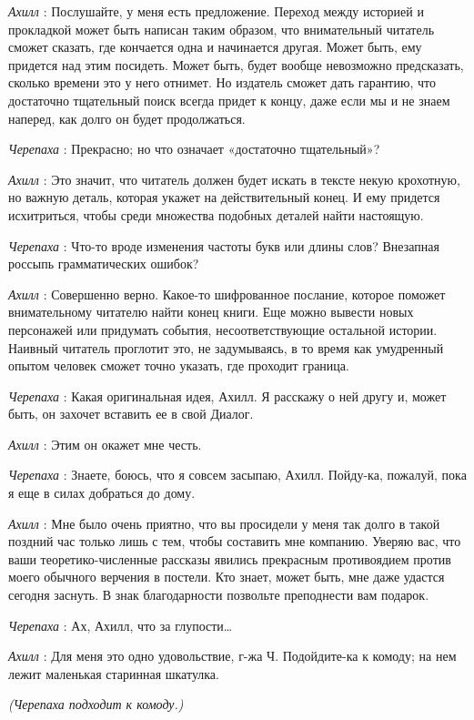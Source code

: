 \emph{Ахилл} : Послушайте, у меня есть предложение. Переход между историей и прокладкой может быть написан таким образом, что внимательный читатель сможет сказать, где кончается одна и начинается другая. Может быть, ему придется над этим посидеть. Может быть, будет вообще невозможно предсказать, сколько времени это у него отнимет. Но издатель сможет дать гарантию, что достаточно тщательный поиск всегда придет к концу, даже если мы и не знаем наперед, как долго он будет продолжаться.

\emph{Черепаха} : Прекрасно; но что означает «достаточно тщательный»?

\emph{Ахилл} : Это значит, что читатель должен будет искать в тексте некую крохотную, но важную деталь, которая укажет на действительный конец. И ему придется исхитриться, чтобы среди множества подобных деталей найти настоящую.

\emph{Черепаха} : Что-то вроде изменения частоты букв или длины слов? Внезапная россыпь грамматических ошибок?

\emph{Ахилл} : Совершенно верно. Какое-то шифрованное послание, которое поможет внимательному читателю найти конец книги. Еще можно вывести новых персонажей или придумать события, несоответствующие остальной истории. Наивный читатель проглотит это, не задумываясь, в то время как умудренный опытом человек сможет точно указать, где проходит граница.

\emph{Черепаха} : Какая оригинальная идея, Ахилл. Я расскажу о ней другу и, может быть, он захочет вставить ее в свой Диалог.

\emph{Ахилл} : Этим он окажет мне честь.

\emph{Черепаха} : Знаете, боюсь, что я совсем засыпаю, Ахилл. Пойду-ка, пожалуй, пока я еще в силах добраться до дому.

\emph{Ахилл} : Мне было очень приятно, что вы просидели у меня так долго в такой поздний час только лишь с тем, чтобы составить мне компанию. Уверяю вас, что ваши теоретико-численные рассказы явились прекрасным противоядием против моего обычного верчения в постели. Кто знает, может быть, мне даже удастся сегодня заснуть. В знак благодарности позвольте преподнести вам подарок.

\emph{Черепаха} : Ах, Ахилл, что за глупости\ldots{}

\emph{Ахилл} : Для меня это одно удовольствие, г-жа Ч. Подойдите-ка к комоду; на нем лежит маленькая старинная шкатулка.

\emph{(Черепаха подходит к комоду.)}

